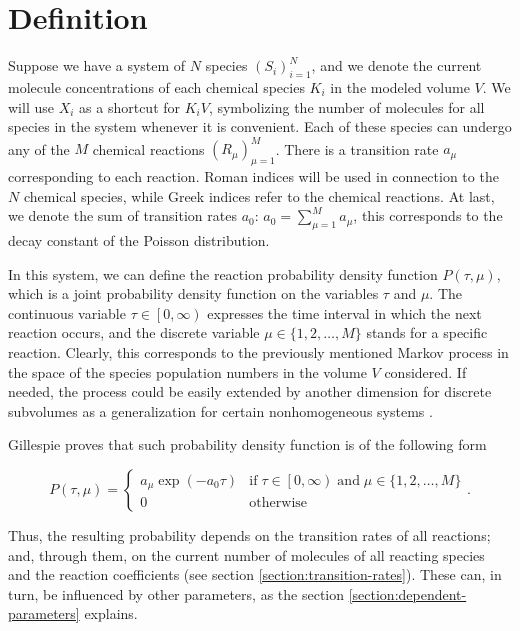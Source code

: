 \section{Definition}

Suppose we have a system of $N$ species $(S_i)_{i=1}^N$, and we denote the current molecule concentrations of each chemical species $K_i$ in the modeled volume $V$. We will use $X_i$ as a shortcut for $K_iV$, symbolizing the number of molecules for all species in the system whenever it is convenient. Each of these species can undergo any of the $M$ chemical reactions $(R_\mu)_{\mu=1}^M$. There is a transition rate $a_\mu$ corresponding to each reaction. Roman indices will be used in connection to the $N$ chemical species, while Greek indices refer to the chemical reactions. At last, we denote the sum of transition rates $a_0$: $a_0 = \sum_{\mu=1}^M a_\mu$, this corresponds to the decay constant of the Poisson distribution.

In this system, we can define the reaction probability density function $P(\tau, \mu)$, which is a joint probability density function on the variables $\tau$ and $\mu$. The continuous variable $\tau \in \left[ 0, \infty \right)$ expresses the time interval in which the next reaction occurs, and the discrete variable $\mu \in \{ 1, 2, \ldots, M \}$ stands for a specific reaction. Clearly, this corresponds to the previously mentioned Markov process in the space of the species population numbers in the volume $V$ considered. If needed, the process could be easily extended by another dimension for discrete subvolumes as a generalization for certain nonhomogeneous systems \cite{gillespie76}.


Gillespie \cite{gillespie76} proves that such probability density function is of the following form

\[
P(\tau, \mu) = \left\{
\begin{array}{ll}
     a_\mu\exp{\left(-a_0\tau\right)} & \mathrm{if}\;\tau \in \left[0, \infty\right) \;\mathrm{and}\; \mu \in \{ 1, 2, \ldots, M \} \\
     0 & \mathrm{otherwise}
\end{array}
\right. .
\]

Thus, the resulting probability depends on the transition rates of all reactions; and, through them, on the current number of molecules of all reacting species and the reaction coefficients (see section \ref{section:transition-rates}). These can, in turn, be influenced by other parameters, as the section \ref{section:dependent-parameters} explains.

